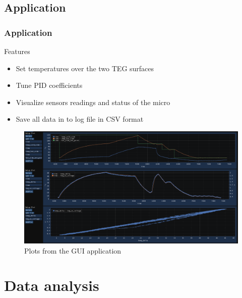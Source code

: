 \subsection{Application}
\begin{frame}
    \frametitle{Application}
\begin{block}{Features}
\begin{itemize}
    \item Set temperatures over the two TEG surfaces
    \item Tune PID coefficients
    \item Visualize sensors readings and status of the micro
    \item Save all data in to log file in CSV format
\end{itemize}
\end{block}

    \begin{figure}
        \centering
        \includegraphics[scale=0.15]{images/app_plots.png}
        \caption{Plots from the GUI application}
    \end{figure}
\end{frame}

\section{Data analysis}
